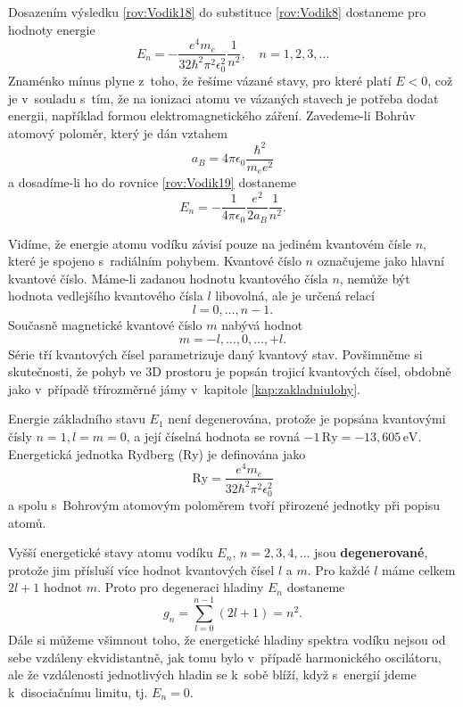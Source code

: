 Dosazením výsledku \eqref{rov:Vodik18} do substituce \eqref{rov:Vodik8} dostaneme pro hodnoty energie 
\begin{equation}
\boxed{E_n = - \frac{e^4 m_e}{32 \hbar^2 \pi^2 \epsilon_0^2} \frac{1}{n^2}, \quad n=1, 2, 3, \dots}
\label{rov:Vodik19}
\end{equation}
Znaménko mínus plyne z~toho, že řešíme vázané stavy, pro které platí $E<0$, což je v~souladu s~tím, že na ionizaci atomu ve vázaných stavech je potřeba dodat energii, například formou elektromagnetického záření. Zavedeme-li Bohrův atomový poloměr, který je dán vztahem
\begin{equation}
a_B = 4 \pi \epsilon_0 \frac{\hbar^2}{m_e e^2}
\label{rov:Vodik20}
\end{equation}
a dosadíme-li ho do rovnice \eqref{rov:Vodik19} dostaneme
\begin{equation}
E_n = - \frac{1}{4 \pi \epsilon_0}\frac{e^2}{2a_B}\frac{1}{n^2} \mbox{.}
\label{rov:Vodik21}
\end{equation}

Vidíme, že energie atomu vodíku závisí pouze na jediném kvantovém čísle $n$, které je spojeno s~radiálním pohybem. Kvantové číslo $n$ označujeme jako hlavní kvantové číslo. Máme-li zadanou hodnotu kvantového čísla $n$, nemůže být hodnota vedlejšího kvantového čísla $l$ libovolná, ale je určená relací
\begin{equation}
\boxed{l = 0, \dots, n-1 \mbox{.}}
\label{rov:Vodik22}
\end{equation}
Současně magnetické kvantové číslo $m$ nabývá hodnot
\begin{equation}
\boxed{m = -l, \dots, 0, \dots, +l \mbox{.}}
\label{rov:Vodik23}
\end{equation}
Série tří kvantových čísel parametrizuje daný kvantový stav. Povšimněme si skutečnosti, že pohyb ve 3D prostoru je popsán trojicí kvantových čísel, obdobně jako v~případě třírozměrné jámy v~kapitole \ref{kap:zakladniulohy}.

Energie základního stavu $E_1$ není degenerována, protože je popsána kvantovými čísly $n=1, l=m=0$, a její číselná hodnota se rovná $- 1 \,\mbox{Ry} = - 13,605 \,\mbox{eV}$. Energetická jednotka Rydberg (Ry) je definována jako
\begin{equation}
\mbox{Ry} = \frac{e^4 m_e}{32 \hbar^2 \pi^2 \epsilon_0^2}
\label{rov:Vodik24}
\end{equation}
a spolu s~Bohrovým atomovým poloměrem tvoří přirozené jednotky při popisu atomů.

Vyšší energetické stavy atomu vodíku $E_n, \,n=2,3,4, \dots$ jsou \textbf{degenerované}, protože jim přísluší více hodnot kvantových čísel $l$ a $m$. Pro každé $l$ máme celkem $2l+1$ hodnot $m$. Proto pro degeneraci hladiny $E_n$ dostaneme
\begin{equation}
g_n = \sum_{l=0}^{n-1}(2l+1) = n^2 \mbox{.}
\label{rov:Vodik25}
\end{equation}
Dále si můžeme všimnout toho, že energetické hladiny spektra vodíku nejsou od sebe vzdáleny ekvidistantně, jak tomu bylo v~případě harmonického oscilátoru, ale že vzdálenosti jednotlivých hladin se k~sobě blíží, když s~energií jdeme k~disociačnímu limitu, tj. $E_n=0$.

